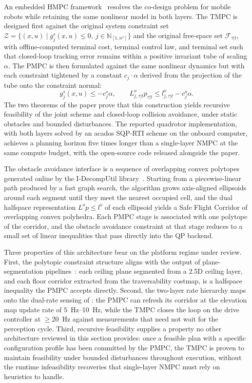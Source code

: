 \documentclass[11pt,a4paper]{article}
\begin{document}
An embedded HMPC framework~\parencite{bendersEmbeddedHierarchicalMPC2025} resolves the co-design problem for mobile robots while retaining the same nonlinear model in both layers. The TMPC is designed first against the original system constraint set $\mathcal{Z} = \{(x,u) \mid g_j^s(x,u) \leq 0, \ j \in \mathbb{N}_{[1,n^s]}\}$ and the original free-space set $\mathcal{F}_{\tau|t}$, with offline-computed terminal cost, terminal control law, and terminal set such that closed-loop tracking error remains within a positive invariant tube of scaling $\alpha$. The PMPC is then formulated against the same nonlinear dynamics but with each constraint tightened by a constant $c_j \cdot \alpha$ derived from the projection of the tube onto the constraint normal:
\begin{equation}
g_j^s(x,u) \leq -c_j^s \alpha, \qquad L_{j,\tau|t}^o p_{\tau|t} \leq l_{j,\tau|t}^o - c_j^o \alpha.
\end{equation}
The two theorems of the paper prove that this construction yields recursive feasibility of the joint scheme and closed-loop collision avoidance, under static obstacles and bounded disturbances. The reported quadrotor implementation, with both layers solved by an acados SQP-RTI scheme on the onboard computer, achieves a planning horizon five times longer than a single-layer NMPC at the same compute budget, with the open-source code released alongside the paper.

The obstacle avoidance interface is a sequence of overlapping convex polytopes generated online by the I-DecompUtil library~\parencite{liu2017sfc}. Starting from a piecewise-linear path produced by a fast graph search, the algorithm grows axis-aligned ellipsoids around each segment until they meet the nearest occupied cell, and the dual halfspace representation $L^o p \leq l^o$ of each ellipsoid yields a Safe Flight Corridor of overlapping convex polyhedra. Each PMPC stage is associated with one polytope of the corridor, and the obstacle avoidance constraint at that stage reduces to a small set of linear inequalities that pass directly into the QP backend.

Three properties of this architecture bear on the platform regime under review. First, the polytopic constraint structure aligns with the output of plane-segmentation pipelines~\cite{schoels2020convex_decomp,erniMEMMultiModalElevation2023}: each ceiling plane segmented from a 2.5D ceiling layer, and each floor corridor extracted from the traversability costmap, is a halfspace inequality the PMPC accepts directly. Second, the two-layer rate hierarchy maps onto the dual-rate sensing of : the PMPC can refresh its corridor at the elevation map update rate of \SIrange{5}{10}{\hertz}, while the TMPC closes the loop on the drive controller at $\geq$\SI{20}{\hertz} against measurements that need not wait for the perception cycle. Third, recursive feasibility supplies a property no other architecture reviewed in this section provides: once a feasible plan with a specific configuration profile has been committed by the PMPC, the TMPC is proven to maintain feasibility under bounded disturbances throughout execution, without the runtime infeasibility recoveries that single-layer NMPC must rely on heuristics to handle.
\end{document}
